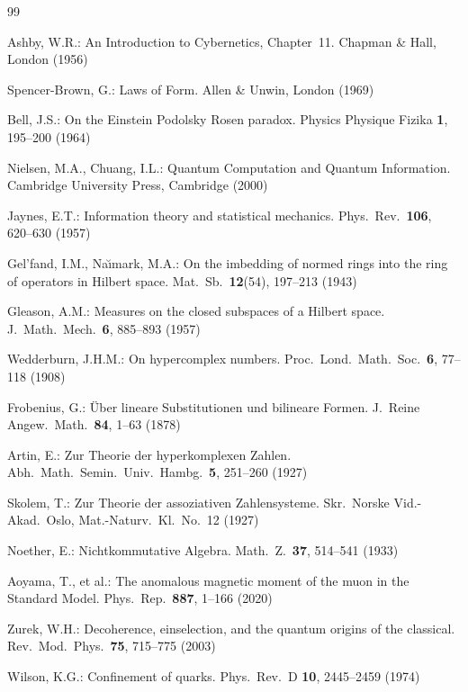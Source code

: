 \documentclass[11pt]{article}
\begin{document}
\begin{thebibliography}{99}

 Ashby, W.R.: An Introduction to Cybernetics, Chapter~11. Chapman \& Hall, London (1956)

 Spencer-Brown, G.: Laws of Form. Allen \& Unwin, London (1969)

 Bell, J.S.: On the Einstein Podolsky Rosen paradox. Physics Physique Fizika \textbf{1}, 195--200 (1964)

 Nielsen, M.A., Chuang, I.L.: Quantum Computation and Quantum Information. Cambridge University Press, Cambridge (2000)

 Jaynes, E.T.: Information theory and statistical mechanics. Phys.\ Rev.\ \textbf{106}, 620--630 (1957)

 Gel'fand, I.M., Na\u{\i}mark, M.A.: On the imbedding of normed rings into the ring of operators in Hilbert space. Mat.\ Sb.\ \textbf{12}(54), 197--213 (1943)

 Gleason, A.M.: Measures on the closed subspaces of a Hilbert space. J.\ Math.\ Mech.\ \textbf{6}, 885--893 (1957)

 Wedderburn, J.H.M.: On hypercomplex numbers. Proc.\ Lond.\ Math.\ Soc.\ \textbf{6}, 77--118 (1908)

 Frobenius, G.: \"{U}ber lineare Substitutionen und bilineare Formen. J.\ Reine Angew.\ Math.\ \textbf{84}, 1--63 (1878)

 Artin, E.: Zur Theorie der hyperkomplexen Zahlen. Abh.\ Math.\ Semin.\ Univ.\ Hambg.\ \textbf{5}, 251--260 (1927)

 Skolem, T.: Zur Theorie der assoziativen Zahlensysteme. Skr.\ Norske Vid.-Akad.\ Oslo, Mat.-Naturv.\ Kl.\ No.~12 (1927)

 Noether, E.: Nichtkommutative Algebra. Math.\ Z.\ \textbf{37}, 514--541 (1933)

 Aoyama, T., et al.: The anomalous magnetic moment of the muon in the Standard Model. Phys.\ Rep.\ \textbf{887}, 1--166 (2020)

 Zurek, W.H.: Decoherence, einselection, and the quantum origins of the classical. Rev.\ Mod.\ Phys.\ \textbf{75}, 715--775 (2003)

 Wilson, K.G.: Confinement of quarks. Phys.\ Rev.\ D \textbf{10}, 2445--2459 (1974)


\end{thebibliography}
\end{document}
